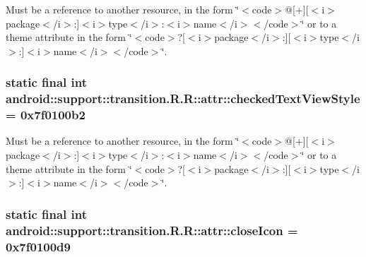 Must be a reference to another resource, in the form \char`\"{}$<$code$>$@\mbox{[}+\mbox{]}\mbox{[}$<$i$>$package$<$/i$>$:\mbox{]}$<$i$>$type$<$/i$>$:$<$i$>$name$<$/i$>$$<$/code$>$\char`\"{} or to a theme attribute in the form \char`\"{}$<$code$>$?\mbox{[}$<$i$>$package$<$/i$>$:\mbox{]}\mbox{[}$<$i$>$type$<$/i$>$:\mbox{]}$<$i$>$name$<$/i$>$$<$/code$>$\char`\"{}. \hypertarget{classandroid_1_1support_1_1transition_1_1_r_1_1attr_8643006ab767bbdabead14e05ccd2fe6}{
\subsubsection[{checkedTextViewStyle}]{\setlength{\rightskip}{0pt plus 5cm}static final int android::support::transition.R.R::attr::checkedTextViewStyle = 0x7f0100b2}}
\label{classandroid_1_1support_1_1transition_1_1_r_1_1attr_8643006ab767bbdabead14e05ccd2fe6}


Must be a reference to another resource, in the form \char`\"{}$<$code$>$@\mbox{[}+\mbox{]}\mbox{[}$<$i$>$package$<$/i$>$:\mbox{]}$<$i$>$type$<$/i$>$:$<$i$>$name$<$/i$>$$<$/code$>$\char`\"{} or to a theme attribute in the form \char`\"{}$<$code$>$?\mbox{[}$<$i$>$package$<$/i$>$:\mbox{]}\mbox{[}$<$i$>$type$<$/i$>$:\mbox{]}$<$i$>$name$<$/i$>$$<$/code$>$\char`\"{}. \hypertarget{classandroid_1_1support_1_1transition_1_1_r_1_1attr_90c101823e5274a056d0759a86e0b5f6}{
\subsubsection[{closeIcon}]{\setlength{\rightskip}{0pt plus 5cm}static final int android::support::transition.R.R::attr::closeIcon = 0x7f0100d9}}
\label{classandroid_1_1support_1_1transition_1_1_r_1_1attr_90c101823e5274a056d0759a86e0b5f6}


